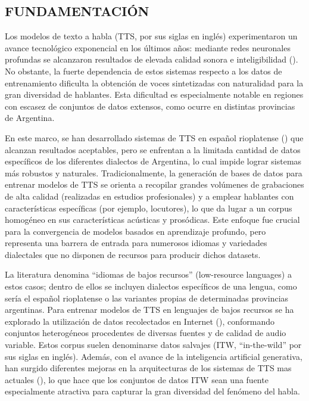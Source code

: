 \subsection{FUNDAMENTACIÓN}

Los modelos de texto a habla (TTS, por sus siglas en inglés) experimentaron un avance tecnológico exponencial en los últimos años: mediante redes neuronales profundas se alcanzaron resultados de elevada calidad sonora e inteligibilidad (\cite{survey1}). No obstante, la fuerte dependencia de estos sistemas respecto a los datos de entrenamiento dificulta la obtención de voces sintetizadas con naturalidad para la gran diversidad de hablantes. Esta dificultad es especialmente notable en regiones con escasez de conjuntos de datos extensos, como ocurre en distintas provincias de Argentina.

En este marco, se han desarrollado sistemas de TTS en español rioplatense (\cite{sintetica}) que alcanzan resultados aceptables, pero se enfrentan a la limitada cantidad de datos específicos de los diferentes dialectos de Argentina, lo cual impide lograr sistemas más robustos y naturales. Tradicionalmente, la generación de bases de datos para entrenar modelos de TTS se orienta a recopilar grandes volúmenes de grabaciones de alta calidad (realizadas en estudios profesionales) y a emplear hablantes con características específicas (por ejemplo, locutores), lo que da lugar a un corpus homogéneo en sus características acústicas y prosódicas. Este enfoque fue crucial para la convergencia de modelos basados en aprendizaje profundo, pero representa una barrera de entrada para numerosos idiomas y variedades dialectales que no disponen de recursos para producir dichos datasets.

La literatura denomina “idiomas de bajos recursos” (low-resource languages) a estos casos; dentro de ellos se incluyen dialectos específicos de una lengua, como sería el español rioplatense o las variantes propias de determinadas provincias argentinas. Para entrenar modelos de TTS en lenguajes de bajos recursos se ha explorado la utilización de datos recolectados en Internet (\cite{erica}), conformando conjuntos heterogéneos procedentes de diversas fuentes y de calidad de audio variable. Estos corpus suelen denominarse datos salvajes (ITW, “in-the-wild” por sus siglas en inglés). Además, con el avance de la inteligencia artificial generativa, han surgido diferentes mejoras en la arquitecturas de los sistemas de TTS mas actuales (\cite{survey2}), lo que hace que los conjuntos de datos ITW sean una fuente especialmente atractiva para capturar la gran diversidad del fenómeno del habla.

